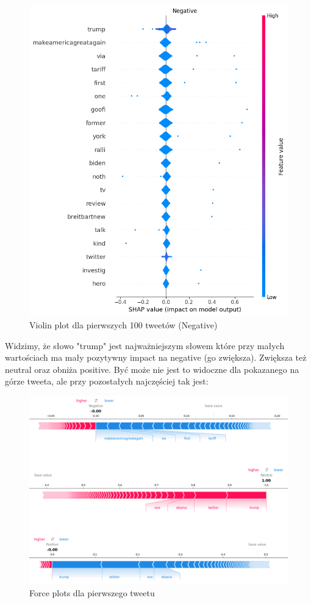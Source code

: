 \documentclass{article}
\begin{document}
\begin{figure}[H]
    \centering
    \includegraphics[width=\textwidth]{assets/violin_negative.png}
    \caption{Violin plot dla pierwszych 100 tweetów (Negative)}
\end{figure}

\newpage

\noindent Widzimy, że słowo "trump" jest najważniejszym słowem które przy małych wartościach ma mały pozytywny impact na negative (go zwiększa). Zwiększa też neutral oraz obniża positive. Być może nie jest to widoczne dla pokazanego na górze tweeta, ale przy pozostałych najczęściej tak jest:

\begin{figure}[H]
    \centering
    \includegraphics[width=\textwidth]{assets/violin_force_example.png}
    \caption{Force plots dla pierwszego tweetu}
\end{figure}
\end{document}
